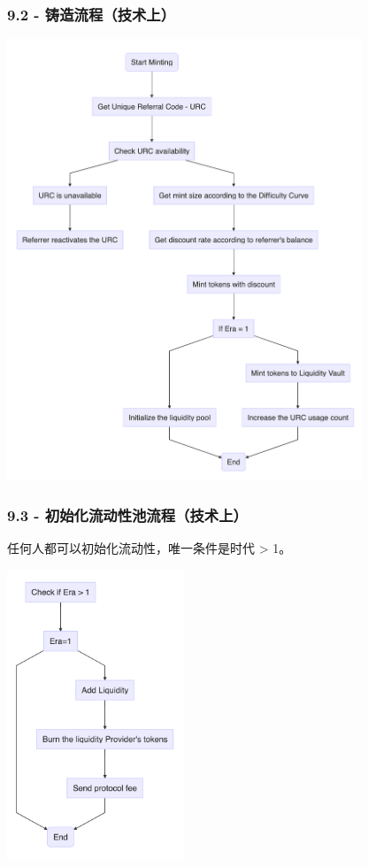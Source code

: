 \documentclass[
]{article}
\begin{document}
\subsubsection{9.2 -
铸造流程（技术上）}\label{ux94f8ux9020ux6d41ux7a0bux6280ux672fux4e0a}

\includegraphics[width=400px]{mint_workflow}

\subsubsection{9.3 -
初始化流动性池流程（技术上）}\label{ux521dux59cbux5316ux6d41ux52a8ux6027ux6c60ux6d41ux7a0bux6280ux672fux4e0a}

任何人都可以初始化流动性，唯一条件是时代 \textgreater{} 1。

\includegraphics[width=200px]{initialize_liquidity_workflow}
\end{document}
